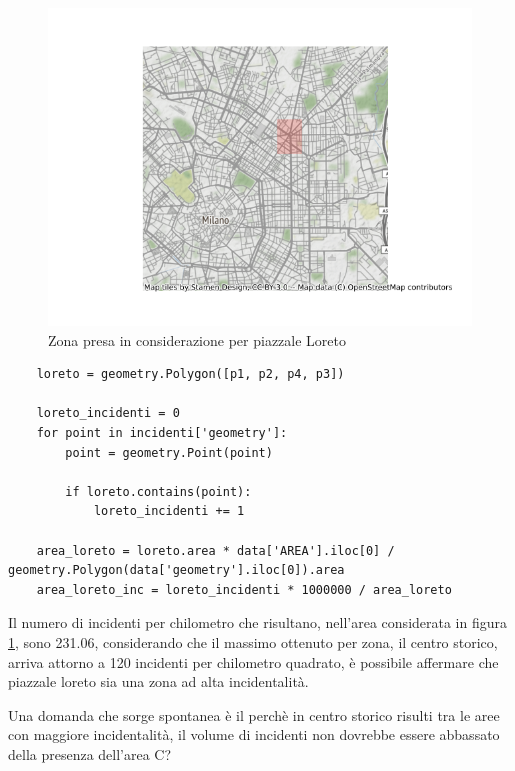 \documentclass[a4paper]{report}
\begin{document}
\begin{figure}
    \includegraphics[width=\linewidth]{../src/municipi_milano/zona_loreto.png}
    \caption{Zona presa in considerazione per piazzale Loreto}
    \label{fig:zona-loreto}
\end{figure}

\begin{lstlisting}
    loreto = geometry.Polygon([p1, p2, p4, p3])

    loreto_incidenti = 0
    for point in incidenti['geometry']: 
        point = geometry.Point(point)

        if loreto.contains(point): 
            loreto_incidenti += 1

    area_loreto = loreto.area * data['AREA'].iloc[0] / geometry.Polygon(data['geometry'].iloc[0]).area
    area_loreto_inc = loreto_incidenti * 1000000 / area_loreto
\end{lstlisting}

Il numero di incidenti per chilometro che risultano, nell'area considerata in figura 
\ref{fig:zona-loreto}, sono 231.06, considerando che il massimo ottenuto per zona, 
il centro storico, arriva attorno a 120 incidenti per chilometro quadrato, è possibile affermare 
che piazzale loreto sia una zona ad alta incidentalità.

Una domanda che sorge spontanea è il perchè in centro storico risulti tra le aree con maggiore 
incidentalità, il volume di incidenti non dovrebbe essere abbassato della presenza dell'area C?
\end{document}
